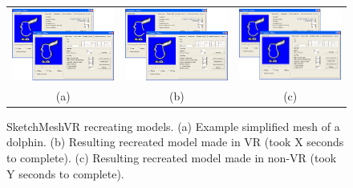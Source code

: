 \begin{figure}[!h]
    \centering
    \setlength{\tabcolsep}{0.0130\linewidth}
    \begin{tabular}{@{}ccc@{}}
    \includegraphics[width=0.3\linewidth]{figures/voldiff_ui}&
  	\includegraphics[width=0.3\linewidth]{figures/voldiff_ui}&
  	\includegraphics[width=0.3\linewidth]{figures/voldiff_ui}\\

    (a)&(b)&(c)\\
    \end{tabular}
    \caption[SketchMeshVR dolphin model]{SketchMeshVR recreating models.
    	  \textup{(a)} Example simplified mesh of a dolphin.
	  \textup{(b)} Resulting recreated model made in VR (took X seconds to complete).
	  \textup{(c)} Resulting recreated model made in non-VR (took Y seconds to complete).
      \label{fig:recreate_dolphin}}
\end{figure}
